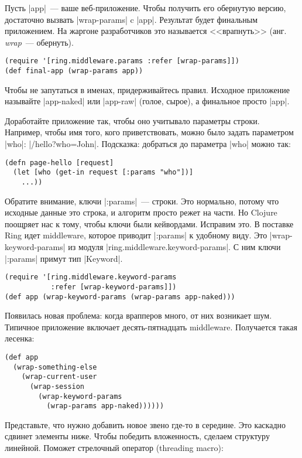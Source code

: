 Пусть \spverb|app|~--- ваше веб-приложение. Чтобы получить его обернутую версию,
достаточно вызвать \spverb|wrap-params| c \spverb|app|. Результат будет финальным приложением. На
жаргоне разработчиков это называется <<врапнуть>> (анг. \emph{wrap}~--- обернуть).

\begin{verbatim}
(require '[ring.middleware.params :refer [wrap-params]])
(def final-app (wrap-params app))
\end{verbatim}

Чтобы не запутаться в именах, придерживайтесь правил. Исходное приложение
называйте \spverb|app-naked| или \spverb|app-raw| (голое, сырое), а финальное
просто \spverb|app|.

Доработайте приложение так, чтобы оно учитывало параметры строки. Например,
чтобы имя того, кого приветствовать, можно было задать параметром \spverb|who|:
\spverb|/hello?who=John|. Подсказка: добраться до параметра \spverb|who| можно так:

\begin{verbatim}
(defn page-hello [request]
  (let [who (get-in request [:params "who"])]
    ...))
\end{verbatim}

Обратите внимание, ключи \spverb|:params|~--- строки. Это нормально, потому что
исходные данные это строка, и алгоритм просто режет на части. Но Clojure
поощряет нас к тому, чтобы ключи были кейвордами. Исправим это. В поставке Ring
идет middleware, которое приводит \spverb|:params| к удобному виду. Это
\spverb|wrap-keyword-params| из модуля \spverb|ring.middleware.keyword-params|.
С ним ключи \spverb|:params| примут тип \spverb|Keyword|.

\begin{verbatim}
(require '[ring.middleware.keyword-params
           :refer [wrap-keyword-params]])
(def app (wrap-keyword-params (wrap-params app-naked)))
\end{verbatim}

Появилась новая проблема: когда врапперов много, от них возникает шум. Типичное
приложение включает десять-пятнадцать middleware. Получается такая лесенка:

\begin{verbatim}
(def app
  (wrap-something-else
    (wrap-current-user
      (wrap-session
        (wrap-keyword-params
          (wrap-params app-naked))))))
\end{verbatim}

Представьте, что нужно добавить новое звено где-то в середине. Это каскадно
сдвинет элементы ниже. Чтобы победить вложенность, сделаем структуру
линейной. Поможет стрелочный оператор (threading macro):

